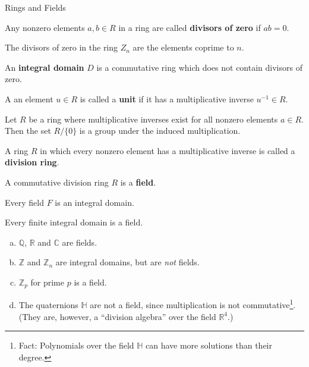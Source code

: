 \begin{section}{Rings and Fields}
\begin{defn}
Any nonzero elements $a,b \in R$ in a ring are called {\bf divisors of zero} if $ab = 0$.
\end{defn}

\begin{ex}
The divisors of zero in the ring $Z_{n}$ are the elements coprime to $n$.
\end{ex}

\begin{defn}
An {\bf integral domain} $D$ is a commutative ring which does not contain divisors of zero.
\end{defn}

\begin{defn}
A an element $u \in R$ is called a {\bf unit} if it has a multiplicative inverse $u^{-1} \in R$.
\end{defn}

\begin{prop}
Let $R$ be a ring where multiplicative inverses exist for all nonzero elements $a \in R$. Then the set $R/\{0\}$ is a group under the induced multiplication.
\end{prop}

\begin{defn}
A ring $R$ in which every nonzero element has a multiplicative inverse is called a {\bf division ring}.
\end{defn}

\begin{defn}
A commutative division ring $R$ is a {\bf field}.
\end{defn}

\begin{prop}
Every field $F$ is an integral domain.
\end{prop}

\begin{prop}
Every finite integral domain is a field.
\end{prop}

\begin{ex}
\begin{enumerate}[(a)]
\item $\mathbb{Q}$, $\mathbb{R}$ and $\mathbb{C}$ are fields.
\item $\mathbb{Z}$ and $\mathbb{Z}_{n}$ are integral domains, but are {\em not} fields.
\item $\mathbb{Z}_{p}$ for prime $p$ is a field.
\item The quaternions $\mathbb{H}$ are not a field, since multiplication is not commutative\footnote{Fact: Polynomials over the field $\mathbb{H}$ can have more solutions than their degree.}. (They are, however, a ``division algebra'' over the field $\mathbb{R}^{4}$.)
\end{enumerate}
\end{ex}


\end{section}
